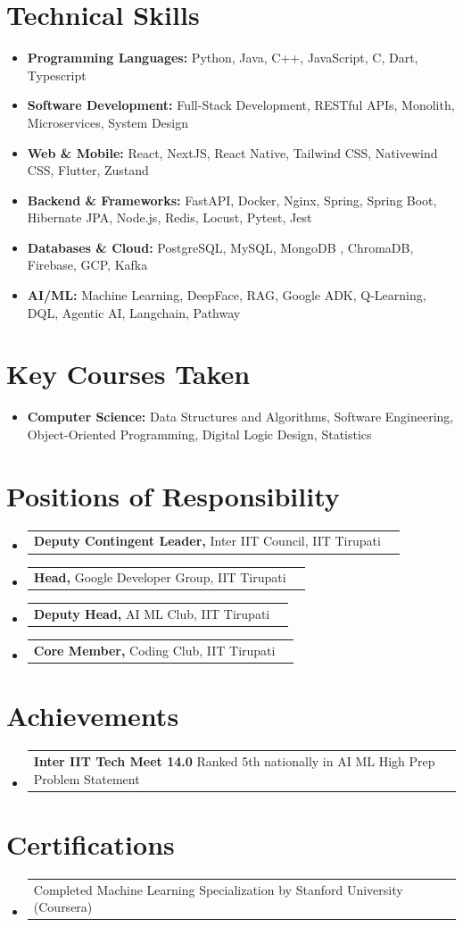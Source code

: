 \documentclass[a4paper,11pt]{article}
\makeatletter
\newcommand{\resumeItem}[2]{
  \item{
    \textbf{#1}{ #2 \vspace{-0.5mm}}
  }
}
\newcommand{\resumePOR}[3]{
\vspace{0.5mm}\item
    \begin{tabular*}{0.97\textwidth}[t]{l@{\extracolsep{\fill}}r}
        \textbf{#1} #2 & \text{\small{#3}} 
    \end{tabular*}
    \vspace{-2mm}
}
\newcommand{\resumeSubItem}[2]{\resumeItem{#1}{#2}\vspace{-4pt}}
\newcommand{\resumeSubHeadingListStart}{\begin{itemize}[leftmargin=*,labelsep=0mm]}
\newcommand{\resumeHeadingSkillStart}{\begin{itemize}[leftmargin=*,itemsep=1.7mm, rightmargin=2ex]}
\newcommand{\resumeSubHeadingListEnd}{\end{itemize}\vspace{2mm}}
\newcommand{\resumeHeadingSkillEnd}{\end{itemize}\vspace{-2mm}}
\makeatother
\begin{document}
\section{\textbf{Technical Skills}}
\resumeHeadingSkillStart
  \resumeSubItem{Programming Languages:}{Python, Java, C++, JavaScript, C, Dart, Typescript}
  \resumeSubItem{Software Development:}{Full-Stack Development, RESTful APIs, Monolith, Microservices, System Design}
  \resumeSubItem{Web \& Mobile:}{React, NextJS, React Native, Tailwind CSS, Nativewind CSS, Flutter, Zustand}
  \resumeSubItem{Backend \& Frameworks:}{FastAPI, Docker, Nginx, Spring, Spring Boot, Hibernate JPA, Node.js, Redis, Locust, Pytest, Jest}
  \resumeSubItem{Databases \& Cloud:}{PostgreSQL, MySQL, MongoDB , ChromaDB, Firebase, GCP, Kafka}
  \resumeSubItem{AI/ML:}{Machine Learning, DeepFace, RAG, Google ADK, Q-Learning, DQL, Agentic AI, Langchain, Pathway}
\resumeHeadingSkillEnd

\section{\textbf{Key Courses Taken}}
\resumeHeadingSkillStart
  \resumeSubItem{Computer Science:}{Data Structures and Algorithms, Software Engineering, Object-Oriented Programming, Digital Logic Design, Statistics}
\resumeHeadingSkillEnd

\section{\textbf{Positions of Responsibility}}
\vspace{-0.4mm}
\resumeSubHeadingListStart
\resumePOR{Deputy Contingent Leader,}{ Inter IIT Council, IIT Tirupati}{Dec 2025 - Present}
\resumePOR{Head,}{ Google Developer Group, IIT Tirupati}{Aug 2025 - Present}
\resumePOR{Deputy Head,}{ AI ML Club, IIT Tirupati}{Jan 2025 - Present}
\resumePOR{Core Member,}{ Coding Club, IIT Tirupati}{Jan 2025 - Present}
\resumeSubHeadingListEnd
\vspace{-4mm}

\section{\textbf{Achievements}}
\vspace{-0.4mm}
\resumeSubHeadingListStart
\resumePOR{Inter IIT Tech Meet 14.0}{ Ranked 5th nationally in AI ML High Prep Problem Statement}{}
\resumeSubHeadingListEnd
\vspace{-4mm}

\section{\textbf{Certifications}}
\vspace{-0.2mm}
\resumeSubHeadingListStart
\resumePOR{}{ Completed Machine Learning Specialization by Stanford University (Coursera)}{}
\resumeSubHeadingListEnd
\end{document}
